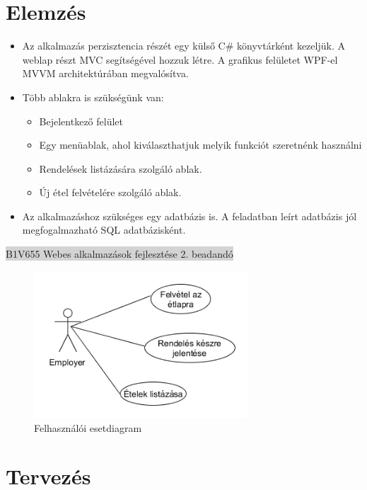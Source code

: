 \documentclass[11pt,a4paper]{article}
\begin{document}
\section{Elemzés}
\begin{itemize}
\item Az alkalmazás perzisztencia részét egy külső C\# könyvtárként kezeljük.
A weblap részt MVC segítségével hozzuk létre. A grafikus felületet WPF-el MVVM
architektúrában megvalósítva.
\item Több ablakra is szükségünk van:
\begin{itemize}
	\item Bejelentkező felület
	\item Egy menüablak, ahol kiválaszthatjuk melyik funkciót szeretnénk használni
	\item Rendelések listázására szolgáló ablak.
	\item Új étel felvételére szolgáló ablak.
\end{itemize}
\item Az alkalmazáshoz szükséges egy adatbázis is. A feladatban leírt adatbázis jól
megfogalmazható SQL adatbázisként.
\end{itemize}

\newpage
\begin{center}
\colorbox{lightgray}{{\large B1V655} \hspace{3cm} {\large Webes alkalmazások fejlesztése 2. beadandó} \hspace{5cm} \thepage}
\end{center}
\begin{figure}[h]
	\centering
	\includegraphics[width=8cm]{uml/UseCase.png}
	\caption{Felhasználói esetdiagram}
\end{figure}

\section{Tervezés}
\end{document}
